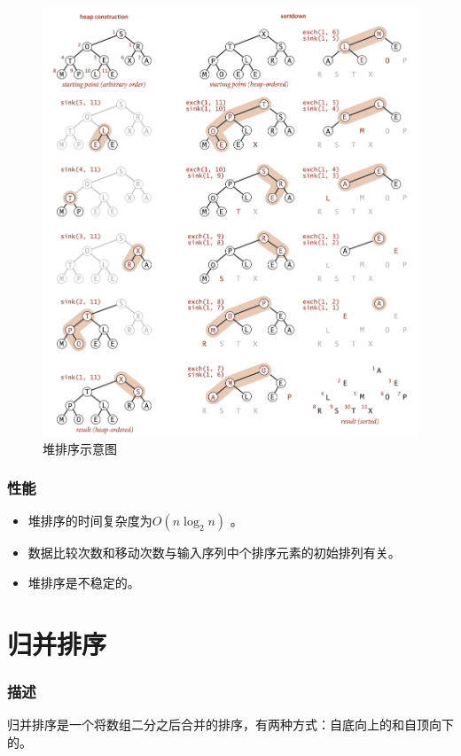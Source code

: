 \newpage

\begin{figure}[H]
    \centering
    \includegraphics[width=14.5cm]{src/heap.png}
    \caption{堆排序示意图}
\end{figure}

\subsubsection{性能}
\begin{itemize}
    \item 堆排序的时间复杂度为$O(n\log_2{n})$ 。
    \item 数据比较次数和移动次数与输入序列中个排序元素的初始排列有关。
    \item 堆排序是不稳定的。
\end{itemize}


\section{归并排序}

\subsubsection{描述}
归并排序是一个将数组二分之后合并的排序，有两种方式：自底向上的和自顶向下的。

